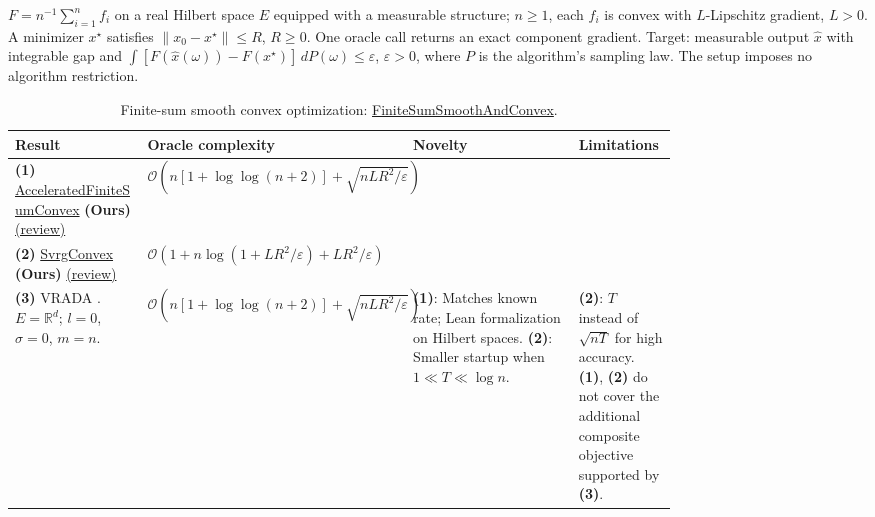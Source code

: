 \begin{table}[tp]
\centering
\caption{Finite-sum smooth convex optimization: \href{https://github.com/k3nfalt/longtails/blob/main/LongTails/Setups/FiniteSumSmoothAndConvex.lean}{FiniteSumSmoothAndConvex}.}\label{tab:FiniteSumSmoothAndConvex}
\parbox{\linewidth}{\footnotesize $F=n^{-1}\sum_{i=1}^n f_i$ on a real Hilbert space $E$ equipped with a measurable structure; $n\ge1$, each $f_i$ is convex with $L$-Lipschitz gradient, $L>0$. A minimizer $x^\star$ satisfies $\|x_0-x^\star\|\le R$, $R\ge0$. One oracle call returns an exact component gradient. Target: measurable output $\widehat x$ with integrable gap and $\int [F(\widehat x(\omega))-F(x^\star)]\,dP(\omega)\le\varepsilon$, $\varepsilon>0$, where $P$ is the algorithm's sampling law. The setup imposes no algorithm restriction.}\par\smallskip
\begin{threeparttable}
\footnotesize
\setlength{\tabcolsep}{4pt}\renewcommand{\arraystretch}{1.25}
\begin{tabularx}{\linewidth}{@{}>{\raggedright\arraybackslash}p{0.20\linewidth}>{\raggedright\arraybackslash}p{0.32\linewidth}>{\raggedright\arraybackslash}p{0.25\linewidth}>{\raggedright\arraybackslash}X@{}}
\toprule
\textbf{Result} & \textbf{Oracle complexity} & \textbf{Novelty} & \textbf{Limitations} \\
\midrule
\textbf{(1)} \href{https://github.com/k3nfalt/longtails/blob/main/LongTails/Theorems/AcceleratedFiniteSumConvex.lean}{Accelerated\allowbreak Finite\allowbreak Sum\allowbreak Convex} \textbf{(Ours)} \href{https://github.com/k3nfalt/longtails/blob/main/scripts/reviews/AcceleratedFiniteSumConvex.md}{(review)}
& $\mathcal{O}\!\left(n[1+\log\log(n+2)]+\sqrt{nLR^2/\varepsilon}\right)$ & & \\
\midrule
\textbf{(2)} \href{https://github.com/k3nfalt/longtails/blob/main/LongTails/Theorems/SvrgConvex.lean}{Svrg\allowbreak Convex} \textbf{(Ours)} \href{https://github.com/k3nfalt/longtails/blob/main/scripts/reviews/SvrgConvex.md}{(review)}
& $\mathcal{O}\!\left(1+n\log(1+LR^2/\varepsilon)+LR^2/\varepsilon\right)$ & & \\
\midrule[1.2pt]
\textbf{(3)} VRADA \citep[Thm.~1, (9)--(11)]{finiteSumSong2021v4}. $E=\mathbb R^d$; $l=0$, $\sigma=0$, $m=n$.
& $\mathcal{O}\!\left(n[1+\log\log(n+2)]+\sqrt{nLR^2/\varepsilon}\right)$
& \textbf{(1)}: Matches known rate; Lean formalization on Hilbert spaces. \textbf{(2)}: Smaller startup when $1\ll T\ll\log n$.
& \textbf{(2)}: $T$ instead of $\sqrt{nT}$ for high accuracy. \textbf{(1)}, \textbf{(2)} do not cover the additional composite objective supported by \textbf{(3)}. \\

\end{tabularx}
\end{threeparttable}
\end{table}
